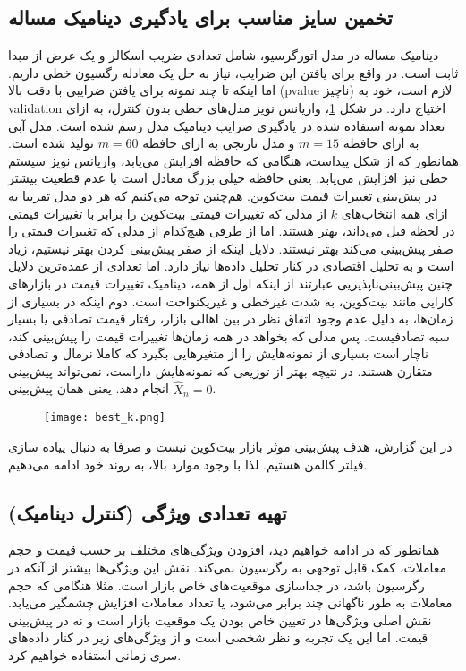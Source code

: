 \documentclass{scribe-cgenomics}
\begin{document}
\subsection{تخمین سایز مناسب برای یادگیری دینامیک مساله}
دینامیک مساله در مدل اتورگرسیو، شامل تعدادی ضریب اسکالر و یک عرض از مبدا ثابت است. در واقع برای یافتن این ضرایب، نیاز به حل یک معادله رگسیون خطی داریم. اما اینکه تا چند نمونه برای یافتن ضرایبی با دقت بالا (pvalue ناچیز) لازم است، خود به
validation
اختیاج دارد. در شکل 
\ref{best_k}،
 واریانس نویز مدل‌های خطی بدون کنترل، به ازای تعداد نمونه استفاده شده در یادگیری ضرایب دینامیک مدل رسم شده است. مدل آبی به ازای حافظه
$m=15$
و مدل نارنجی به ازای حافظه
$m=60$
تولید شده است. همانطور که از شکل پیداست، هنگامی که حافظه افزایش می‌یابد، واریانس نویز سیستم خطی نیز افزایش می‌یابد. یعنی حافظه خیلی بزرگ معادل است با عدم قطعیت بیشتر در پیش‌بینی تغییرات قیمت بیت‌کوین. هم‌چنین توجه می‌کنیم که هر دو مدل تقریبا به ازای همه انتخاب‌های
$k$
از مدلی که تغییرات قیمتی بیت‌کوین را برابر با تغییرات قیمتی در لحظه قبل می‌داند، بهتر هستند. اما از طرفی هیچ‌کدام از مدلی که تغییرات قیمتی را صفر پیش‌بینی می‌کند بهتر نیستند. دلایل اینکه از صفر پیش‌بینی کردن بهتر نیستیم، زیاد است و به تحلیل اقتصادی در کنار تحلیل داده‌ها نیاز دارد. اما تعدادی از عمده‌ترین دلایل چنین پیش‌بینی‌ناپذیریی عبارتند از اینکه اول از همه، دینامیک تغییرات قیمت در بازارهای کارایی مانند بیت‌کوین، به شدت غیرخطی و غیریکنواخت است. دوم اینکه در بسیاری از زمان‌ها، به دلیل عدم وجود اتفاق نظر در بین اهالی بازار، رفتار قیمت تصادفی یا بسیار سبه تصادفیست. پس مدلی که بخواهد در همه زمان‌ها تغییرات قیمت را پیش‌بینی کند، ناچار است بسیاری از نمونه‌هایش را از متغیرهایی بگیرد که کاملا نرمال و تصادفی متقارن هستند. در نتیچه بهتر از توزیعی که نمونه‌هایش داراست، نمی‌تواند پیش‌بینی انجام دهد. یعنی همان پیش‌بینی
$\hat{X}_n = 0$.

\begin{figure}\label{best_k}
\texttt{[image: best\_k.png]}
\centering
\end{figure}

در این گزارش، هدف پیش‌بینی موثر بازار بیت‌کوین نیست و صرفا به دنبال پیاده سازی فیلتر کالمن هستیم. لذا با وجود موارد بالا، به روند خود ادامه می‌دهیم.






\subsection{تهیه تعدادی ویژگی (کنترل دینامیک)}
همانطور که در ادامه خواهیم دید، افزودن ویژگی‌های مختلف بر حسب قیمت و حجم معاملات، کمک قابل توجهی به رگرسیون نمی‌کند. نقش این ویژگی‌ها بیشتر از آنکه در رگرسیون باشد، در جداسازی موقعیت‌های خاص بازار است. مثلا هنگامی که حجم معاملات به طور ناگهانی چند برابر می‌شود، یا تعداد معاملات افزایش چشمگیر می‌یابد. نقش اصلی ویژگی‌ها در تعیین خاص بودن یک موقعیت بازار است و نه در پیش‌بینی قیمت. اما این یک تجربه و نظر شخصی است و از ویژگی‌های زیر در کنار داده‌های سری زمانی استفاده خواهیم کرد.
\end{document}

